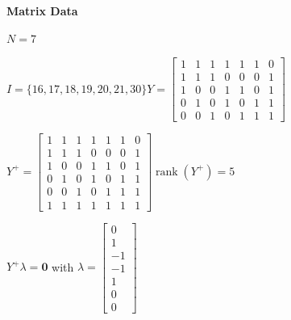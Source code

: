 \documentclass[11pt]{article}
\begin{document}
\noindent\textbf{Matrix Data}
\par $N=7$
\par $I=\{16,17,18,19,20,21,30\}$\quad$Y=\begin{bmatrix}1 & 1 & 1 & 1 & 1 & 1 & 0 \\ 1 & 1 & 1 & 0 & 0 & 0 & 1 \\ 1 & 0 & 0 & 1 & 1 & 0 & 1 \\ 0 & 1 & 0 & 1 & 0 & 1 & 1 \\ 0 & 0 & 1 & 0 & 1 & 1 & 1\end{bmatrix}$
\par $Y^{+}=\begin{bmatrix}1 & 1 & 1 & 1 & 1 & 1 & 0 \\ 1 & 1 & 1 & 0 & 0 & 0 & 1 \\ 1 & 0 & 0 & 1 & 1 & 0 & 1 \\ 0 & 1 & 0 & 1 & 0 & 1 & 1 \\ 0 & 0 & 1 & 0 & 1 & 1 & 1 \\ 1 & 1 & 1 & 1 & 1 & 1 & 1\end{bmatrix}$\quad$\operatorname{rank}(Y^{+})=5$
\par $Y^{+}\lambda=\mathbf{0}$ with $\lambda=\begin{bmatrix}0 \\ 1 \\ -1 \\ -1 \\ 1 \\ 0 \\ 0\end{bmatrix}$
\end{document}
